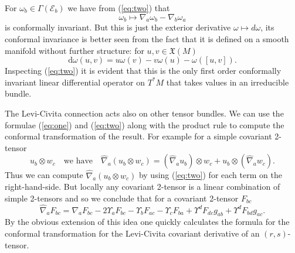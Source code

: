 \documentclass[a4paper,12pt]{amsart}
\def\Cal{\mathcal}
\newcommand{\ce}{{\Cal E}}
\newcommand{\om}{\omega}
\theoremstyle{remark}
\newcommand{\nn}[1]{(\ref{#1})}
\begin{document}
For $\om_b\in \Gamma(\ce_b)$ we 
have from \nn{eq:two}
that 
$$
\om_b\mapsto \nabla_a \om_b- \nabla_b \om_a
$$
is conformally invariant. But this is just the exterior derivative $\om \mapsto d\om $, its conformal invariance is better seen from the fact that it
 is defined on a smooth manifold without further structure: for $u,v\in \mathfrak{X}(M)$
$$
\mathrm{d}\om (u,v) = u \om(v)-v\om (u)-\om ( [u,v]). 
$$ Inspecting \nn{eq:two} it is evident that this is the only first
order conformally invariant linear differential operator on $T^*M$
that takes values in an irreducible bundle.

The Levi-Civita connection acts also on other tensor bundles. We
can use the formulae \nn{eq:one} and \nn{eq:two} along with the product
rule to compute the conformal transformation of the result. For
example for a simple covariant 2-tensor
$$
u_b\otimes w_c \quad \mbox{we have} \quad \widehat{\nabla}_a(u_b\otimes w_c)=
(\widehat{\nabla}_a u_b)\otimes w_c+ u_b\otimes (\widehat{\nabla}_a w_c). 
$$ 
Thus we can compute $\widehat{\nabla}_a(u_b\otimes w_c) $ by
using \nn{eq:two} for each term on the right-hand-side.  But locally
any covariant 2-tensor is a linear combination of simple 2-tensors and
so we conclude that for a covariant 2-tensor $F_{bc}$
\begin{equation}\label{Ft}
\widehat{\nabla}_a F_{bc}= \nabla_a F_{bc}- 2\Upsilon_a F_{bc}
-\Upsilon_b F_{ac}-\Upsilon_c F_{ba} + \Upsilon^d F_{d c}g_{ab} +
\Upsilon^d F_{b d}g_{ac} .
\end{equation}
By the obvious extension of this idea one quickly calculates the
formula for the conformal transformation for the Levi-Civita covariant
derivative of an $(r,s)$-tensor.
\end{document}
